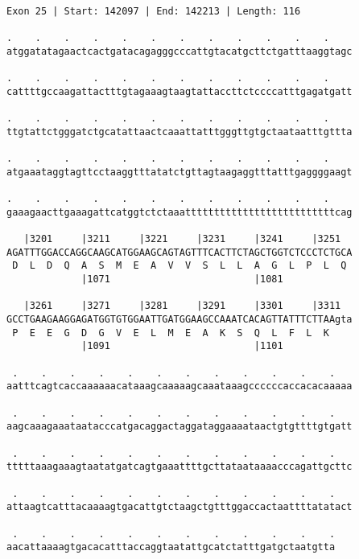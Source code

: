 \documentclass{article}
\begin{document}
\begin{Verbatim}[fontfamily=courier]
Exon 25 | Start: 142097 | End: 142213 | Length: 116

.    .    .    .    .    .    .    .    .    .    .    .    
atggatatagaactcactgatacagagggcccattgtacatgcttctgatttaaggtagc

.    .    .    .    .    .    .    .    .    .    .    .    
cattttgccaagattactttgtagaaagtaagtattaccttctccccatttgagatgatt

.    .    .    .    .    .    .    .    .    .    .    .    
ttgtattctgggatctgcatattaactcaaattatttgggttgtgctaataatttgttta

.    .    .    .    .    .    .    .    .    .    .    .    
atgaaataggtagttcctaaggtttatatctgttagtaagaggtttatttgaggggaagt

.    .    .    .    .    .    .    .    .    .    .    .    
gaaagaacttgaaagattcatggtctctaaattttttttttttttttttttttttttcag

   |3201     |3211     |3221     |3231     |3241     |3251  
AGATTTGGACCAGGCAAGCATGGAAGCAGTAGTTTCACTTCTAGCTGGTCTCCCTCTGCA
 D  L  D  Q  A  S  M  E  A  V  V  S  L  L  A  G  L  P  L  Q 
             |1071                         |1081            

   |3261     |3271     |3281     |3291     |3301     |3311  
GCCTGAAGAAGGAGATGGTGTGGAATTGATGGAAGCCAAATCACAGTTATTTCTTAAgta
 P  E  E  G  D  G  V  E  L  M  E  A  K  S  Q  L  F  L  K    
             |1091                         |1101            

 .    .    .    .    .    .    .    .    .    .    .    .   
aatttcagtcaccaaaaaacataaagcaaaaagcaaataaagccccccaccacacaaaaa

 .    .    .    .    .    .    .    .    .    .    .    .   
aagcaaagaaataatacccatgacaggactaggataggaaaataactgtgttttgtgatt

 .    .    .    .    .    .    .    .    .    .    .    .   
tttttaaagaaagtaatatgatcagtgaaattttgcttataataaaacccagattgcttc

 .    .    .    .    .    .    .    .    .    .    .    .   
attaagtcatttacaaaagtgacattgtctaagctgtttggaccactaattttatatact

 .    .    .    .    .    .    .    .    .    .    .    .
aacattaaaagtgacacatttaccaggtaatattgcatctatttgatgctaatgtta
\end{Verbatim}
\newpage
\end{document}
